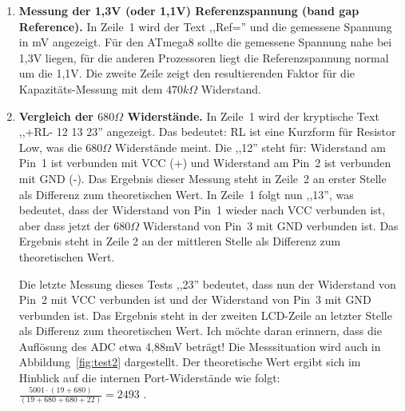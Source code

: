 \begin{enumerate}

\item {\bf Messung der 1,3V (oder 1,1V) Referenzspannung (band gap Reference).} In Zeile~1 wird der Text ,,Ref='' und die
gemessene Spannung in mV angezeigt.
Für den ATmega8 sollte die gemessene Spannung nahe bei 1,3V liegen, für die anderen Prozessoren liegt
die Referenzspannung normal um die 1,1V.
Die zweite Zeile zeigt den resultierenden Faktor für die Kapazitäts-Messung mit dem \(470k\Omega\) Widerstand.

\item {\bf Vergleich der \(680\Omega\) Widerstände.} 
In Zeile~1 wird der kryptische Text  ,,+RL- 12 13 23'' angezeigt. Das bedeutet:
RL ist eine Kurzform für Resistor Low, was die \(680\Omega\) Widerstände meint. Die ,,12'' steht für: 
Widerstand am Pin~1 ist verbunden mit VCC (+) und Widerstand am Pin~2 ist verbunden mit GND (-). 
Das Ergebnis dieser Messung steht in Zeile~2 an erster Stelle als Differenz zum theoretischen Wert.
 In Zeile~1 folgt nun ,,13'', was bedeutet, dass der Widerstand von Pin~1 wieder nach VCC verbunden ist,
aber dass jetzt der \(680\Omega\) Widerstand von Pin~3  mit GND verbunden ist.
Das Ergebnis steht in Zeile 2 an der mittleren Stelle als Differenz zum theoretischen Wert.

Die letzte Messung dieses Tests ,,23'' bedeutet, dass nun der Widerstand von Pin~2 mit VCC verbunden ist und
der Widerstand von Pin~3 mit GND verbunden ist.
Das Ergebnis steht in der zweiten LCD-Zeile an letzter Stelle als Differenz zum theoretischen Wert.
Ich möchte daran erinnern, dass die Auflösung des ADC etwa 4,88mV beträgt!
Die Messsituation wird auch in Abbildung~\ref{fig:test2} dargestellt.
Der theoretische Wert ergibt sich im Hinblick auf die internen Port-Widerstände wie folgt:
\(\frac{5001 \cdot  (19+680)}{ (19+680+680+22)} = 2493\) .


\end{enumerate}

